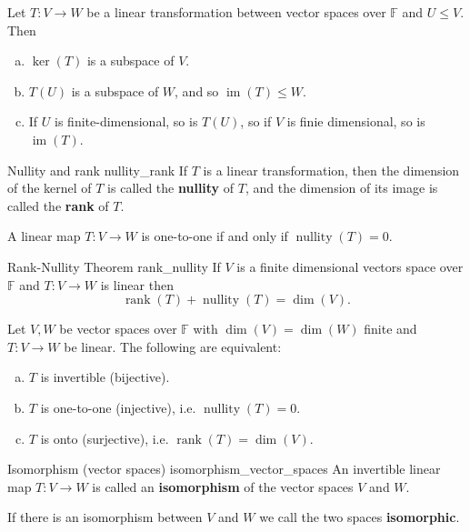 \begin{theorem}{\cite{math2601_notes}}{}
	Let $T : V \to W$ be a linear transformation between vector spaces over $\mathbb{F}$ and $U \leq V$. Then
	\begin{enumerate}[a)]
		\item $\operatorname{ker}(T)$ is a subspace of $V$.
		\item $T(U)$ is a subspace of $W$, and so $\operatorname{im}(T) \leq W$.
		\item If $U$ is finite-dimensional, so is $T(U)$, so if $V$ is finie dimensional, so is $\operatorname{im}(T)$.
	\end{enumerate}
\end{theorem}

\begin{definition}{Nullity and rank \cite{math2601_notes}}{nullity_rank}
	If $T$ is a linear transformation, then the dimension of the kernel of $T$ is called the \textbf{nullity} of $T$, and the dimension of its image is called the \textbf{rank} of $T$.
\end{definition}

\begin{lemma}{\cite{math2601_notes}}{}
	A linear map $T : V \to W$ is one-to-one if and only if $\operatorname{nullity}(T) = 0$.
\end{lemma}

\begin{theorem}{Rank-Nullity Theorem \cite{math2601_notes}}{rank_nullity}
	If $V$ is a finite dimensional vectors space over $\mathbb{F}$ and $T : V \to W$ is linear then
	$$ \operatorname{rank}(T) + \operatorname{nullity}(T) = \dim (V) . $$
\end{theorem}

\begin{theorem}{}{}
	Let $V, W$ be vector spaces over $\mathbb{F}$ with $\dim (V) = \dim (W)$ finite and $T : V \to W$ be linear. The following are equivalent:
	\begin{enumerate}[a)]
		\item $T$ is invertible (bijective).
		\item $T$ is one-to-one (injective), i.e. $\operatorname{nullity}(T) = 0$.
		\item $T$ is onto (surjective), i.e. $\operatorname{rank}(T) = \dim (V)$.
	\end{enumerate}
\end{theorem}

\begin{definition}{Isomorphism (vector spaces) \cite{math2601_notes}}{isomorphism_vector_spaces}
	An invertible linear map $T : V \to W$ is called an \textbf{isomorphism} of the vector spaces $V$ and $W$.
	
	If there is an isomorphism between $V$ and $W$ we call the two spaces \textbf{isomorphic}.
\end{definition}

